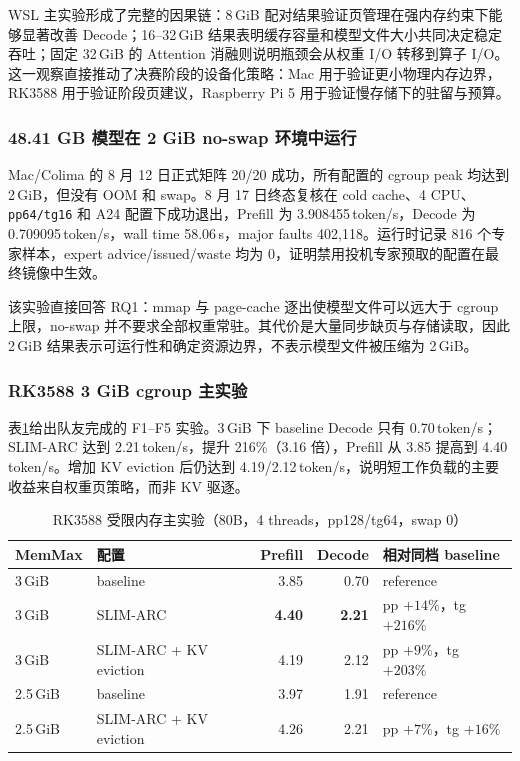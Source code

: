 WSL 主实验形成了完整的因果链：8\,GiB 配对结果验证页管理在强内存约束下能够显著改善 Decode；16--32\,GiB 结果表明缓存容量和模型文件大小共同决定稳定吞吐；固定 32\,GiB 的 Attention 消融则说明瓶颈会从权重 I/O 转移到算子 I/O。这一观察直接推动了决赛阶段的设备化策略：Mac 用于验证更小物理内存边界，RK3588 用于验证阶段页建议，Raspberry Pi 5 用于验证慢存储下的驻留与预算。

\subsubsection{48.41 GB 模型在 2 GiB no-swap 环境中运行}

Mac/Colima 的 8 月 12 日正式矩阵 20/20 成功，所有配置的 cgroup peak 均达到 2\,GiB，但没有 OOM 和 swap。8 月 17 日终态复核在 cold cache、4 CPU、\texttt{pp64/tg16} 和 A24 配置下成功退出，Prefill 为 3.908455\,token/s，Decode 为 0.709095\,token/s，wall time 58.06\,s，major faults 402,118。运行时记录 816 个专家样本，expert advice/issued/waste 均为 0，证明禁用投机专家预取的配置在最终镜像中生效。

该实验直接回答 RQ1：mmap 与 page-cache 逐出使模型文件可以远大于 cgroup 上限，no-swap 并不要求全部权重常驻。其代价是大量同步缺页与存储读取，因此 2\,GiB 结果表示可运行性和确定资源边界，不表示模型文件被压缩为 2\,GiB。

\subsubsection{RK3588 3 GiB cgroup 主实验}

表\ref{tab:rk-3g-main}给出队友完成的 F1--F5 实验。3\,GiB 下 baseline Decode 只有 0.70\,token/s；SLIM-ARC 达到 2.21\,token/s，提升 216\%（3.16 倍），Prefill 从 3.85 提高到 4.40\,token/s。增加 KV eviction 后仍达到 4.19/2.12\,token/s，说明短工作负载的主要收益来自权重页策略，而非 KV 驱逐。

\begin{table}[H]
  \centering
  \small
  \caption{RK3588 受限内存主实验（80B，4 threads，pp128/tg64，swap 0）}
  \label{tab:rk-3g-main}
  \begin{tabular}{llrrl}
    \toprule
    MemMax & 配置 & Prefill & Decode & 相对同档 baseline \\
    \midrule
    3\,GiB & baseline & 3.85 & 0.70 & reference \\
    3\,GiB & SLIM-ARC & \textbf{4.40} & \textbf{2.21} & pp $+14\%$，tg $+216\%$ \\
    3\,GiB & SLIM-ARC + KV eviction & 4.19 & 2.12 & pp $+9\%$，tg $+203\%$ \\
    2.5\,GiB & baseline & 3.97 & 1.91 & reference \\
    2.5\,GiB & SLIM-ARC + KV eviction & 4.26 & 2.21 & pp $+7\%$，tg $+16\%$ \\
    \bottomrule
  \end{tabular}
\end{table}

